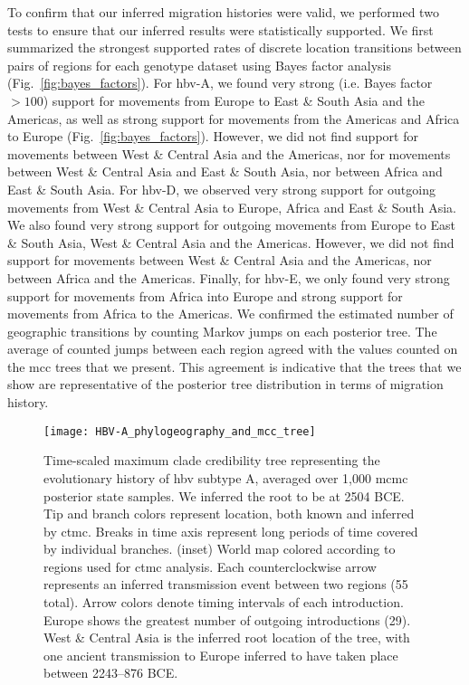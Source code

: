 To confirm that our inferred migration histories were valid, we performed two tests to ensure that our inferred results were statistically supported.
We first summarized the strongest supported rates of discrete location transitions between pairs of regions for each genotype dataset using Bayes factor analysis (Fig.~\ref{fig:bayes_factors}).
For \gls{hbv}-A, we found very strong (i.e. Bayes factor $>100$) support for movements from Europe to East \& South Asia and the Americas, as well as strong support for movements from the Americas and Africa to Europe (Fig.~\ref{fig:bayes_factors}).
However, we did not find support for movements between West \& Central Asia and the Americas, nor for movements between West \& Central Asia and East \& South Asia, nor between Africa and East \& South Asia.
For \gls{hbv}-D, we observed very strong support for outgoing movements from West \& Central Asia to Europe, Africa and East \& South Asia.
We also found very strong support for outgoing movements from Europe to East \& South Asia, West \& Central Asia and the Americas.
However, we did not find support for movements between West \& Central Asia and the Americas, nor between Africa and the Americas.
Finally, for \gls{hbv}-E, we only found very strong support for movements from Africa into Europe and strong support for movements from Africa to the Americas.
We confirmed the estimated number of geographic transitions by counting Markov jumps on each posterior tree.
The average of counted jumps between each region agreed with the values counted on the \gls{mcc} trees that we present.
This agreement is indicative that the trees that we show are representative of the posterior tree distribution in terms of migration history.

\begin{figure}[ht]
  \centering
  \medskip
  \texttt{[image: HBV-A\_phylogeography\_and\_mcc\_tree]}
  \caption[HBV-A phylogeography ]{Time-scaled maximum clade credibility tree representing the evolutionary history of \gls{hbv} subtype A, averaged over 1,000 \gls{mcmc} posterior state samples. We inferred the root to be at 2504 BCE. Tip and branch colors represent location, both known and inferred by \gls{ctmc}. Breaks in time axis represent long periods of time covered by individual branches. (inset) World map colored according to regions used for \gls{ctmc} analysis. Each counterclockwise arrow represents an inferred transmission event between two regions (55 total). Arrow colors denote timing intervals of each introduction. Europe shows the greatest number of outgoing introductions (29). West \& Central Asia is the inferred root location of the tree, with one ancient transmission to Europe inferred to have taken place between 2243--876 BCE.}
  \label{fig:HBV-A_phylogeo}
\end{figure}

